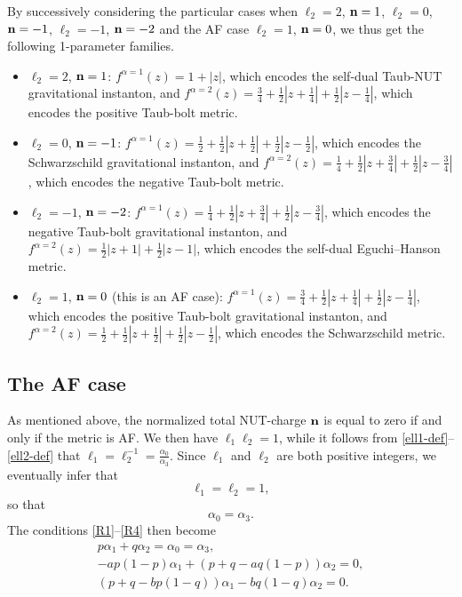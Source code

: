 \documentclass[pdftex]{sigma}
\numberwithin{equation}{section}
\begin{document}
By successively considering the particular cases when $\ell _2 = 2$, ${\bf n} = 1$, $\ell _2 = 0$, ${\bf n} = - 1$, $\ell _2 = - 1$, ${\bf n} = - 2$ and the AF case $\ell _2 = 1$, ${\bf n} = 0$, we thus get the following 1-parameter families.
\begin{itemize}\itemsep=0pt
 \item[(i)] $\ell _2 = 2$, ${\bf n} = 1$: $f^{\alpha = 1} (z) = 1 + |z|$, which encodes the self-dual Taub-NUT gravitational instanton, and $f ^{\alpha = 2} (z) = \frac{3}{4} + \frac{1}{2} |z + \frac{1}{4}| + \frac{1}{2} |z - \frac{1}{4}|$, which encodes the positive Taub-bolt metric.
\item[(ii)] $\ell _2 = 0$, ${\bf n} = - 1$: $f^{\alpha = 1} (z) = \frac{1}{2} + \frac{1}{2} |z + \frac{1}{2}| + \frac{1}{2} |z - \frac{1}{2}|$, which encodes the Schwarzschild gravitational instanton, and $f^{\alpha = 2} (z) = \frac{1}{4} + \frac{1}{2} |z + \frac{3}{4}| + \frac{1}{2} |z - \frac{3}{4}|$, which encodes the negative Taub-bolt metric.
\item[(iii)] $\ell _2 = - 1$, ${\bf n} = - 2$: $f^{\alpha = 1} (z) = \frac{1}{4} + \frac{1}{2} |z + \frac{3}{4}| + \frac{1}{2} |z - \frac{3}{4}|$, which encodes the negative Taub-bolt gravitational instanton, and $f^{\alpha = 2} (z) = \frac{1}{2} |z + 1| + \frac{1}{2} |z - 1|$, which encodes the self-dual Eguchi--Hanson metric.
\item[(iv)] $\ell _2 = 1$, ${\bf n} = 0$ (this is an AF case): $f^{\alpha = 1} (z) = \frac{3}{4} + \frac{1}{2} |z + \frac{1}{4}| + \frac{1}{2} |z - \frac{1}{4}|$, which encodes the positive Taub-bolt gravitational instanton, and $f^{\alpha = 2} (z) = \frac{1}{2} + \frac{1}{2} |z + \frac{1}{2}| + \frac{1}{2} |z - \frac{1}{2}|$, which encodes the Schwarzschild metric.
\end{itemize}




\subsection{The AF case} \label{ss-AF}
As mentioned above, the normalized total NUT-charge ${\bf n}$ is equal to zero if and only if the metric is AF. We then have $\ell _1 \ell_2 = 1$, while it follows from \eqref{ell1-def}--\eqref{ell2-def} that $\ell _1 = \ell _2 ^{-1} = \frac{\alpha _0}{\alpha _3}$. Since $\ell _1$ and $\ell _2$ are both positive integers, we eventually infer that
\[ \ell _1 = \ell _2 = 1, \]
so that
\[ \alpha _0 = \alpha _3. \]
The conditions \eqref{R1}--\eqref{R4} then become
\begin{gather*}%
p \alpha _1 + q \alpha _2 = \alpha _0 = \alpha _3, \\
 - a p (1 - p) \alpha _1 + (p + q - a q (1 - p)) \alpha _2 = 0, \\
 (p + q - b p (1 - q)) \alpha _1 - b q (1 - q) \alpha _2 = 0. \end{gather*}
\end{document}

